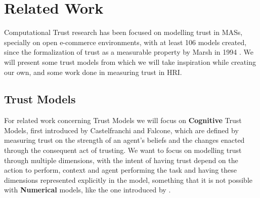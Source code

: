

\section{Related Work}
\label{sec:Related Work}
Computational Trust research has been focused on modelling trust in \acp{MAS}, specially on open e-commerce environments\cite{Granatyr2015, HanYu2013, Pinyol2013, Noorian2010, Huang2008}, with at least 106 models created\cite{Granatyr2015}, since the formalization of trust as a measurable property by Marsh in 1994 \cite{Marsh1994}. We will present some trust models from which we will take inspiration while creating our own, and some work done in measuring trust in \ac{HRI}.

\subsection{Trust Models}
\label{subsec:Related work:Trust Models}
For related work concerning Trust Models we will focus on \textbf{Cognitive} Trust Models, first introduced by Castelfranchi and Falcone\cite{Castelfranchi1998}, which are defined by measuring trust on the strength of an agent's beliefs and the changes enacted through the consequent act of trusting. We want to focus on modelling trust through multiple dimensions, with the intent of having trust depend on the action to perform, context and agent performing the task and having these dimensions represented explicitly in the model, something that it is not possible with \textbf{Numerical} models, like the one introduced by \cite{Marsh1994}. 



